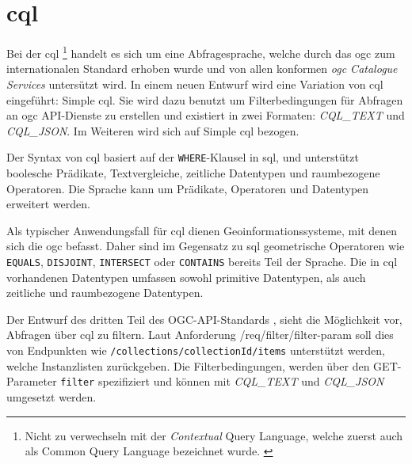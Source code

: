 \section{\acl{cql}}


Bei der \acf{cql} \footnote{Nicht zu verwechseln mit der \textit{Contextual} Query Language, welche
zuerst auch als Common Query Language bezeichnet wurde.
\parencite{thelibraryofcongressCQLContextual2023, ZINGGentle2003}} handelt es sich um eine
Abfragesprache, welche durch das \ac{ogc} zum internationalen Standard erhoben wurde und von allen
konformen \textit{\ac{ogc} Catalogue Services} untersützt wird.  In
einem neuen Entwurf  wird eine Variation von \ac{cql} eingeführt: Simple
\ac{cql}. Sie wird dazu benutzt um Filterbedingungen für Abfragen an \ac{ogc} API-Dienste zu
erstellen und existiert in zwei Formaten: \textit{CQL\_TEXT} und \textit{CQL\_JSON}.  Im
Weiteren wird sich auf Simple \ac{cql} bezogen.

Der Syntax von \ac{cql} basiert auf der \texttt{WHERE}-Klausel in \acs{sql}, und unterstützt
boolesche Prädikate, Textvergleiche, zeitliche Datentypen und raumbezogene Operatoren. Die Sprache
kann um Prädikate, Operatoren und Datentypen erweitert werden.

Als typischer Anwendungsfall für \ac{cql} dienen Geoinformationssysteme, mit denen sich die \ac{ogc}
befasst. Daher sind im Gegensatz zu \ac{sql} geometrische Operatoren wie \texttt{EQUALS},
\texttt{DISJOINT}, \texttt{INTERSECT} oder \texttt{CONTAINS} bereits Teil der Sprache. Die in
\ac{cql} vorhandenen Datentypen umfassen sowohl primitive Datentypen, als auch zeitliche und
raumbezogene Datentypen.

Der Entwurf des dritten Teil des OGC-API-Standards , sieht die
Möglichkeit vor, Abfragen über \ac{cql} zu filtern. Laut Anforderung /req/filter/filter-param soll
dies von Endpunkten wie \texttt{/collections/{collectionId}/items} unterstützt werden, welche
Instanzlisten zurückgeben. Die Filterbedingungen, werden über den GET-Parameter \texttt{filter}
spezifiziert und können mit \textit{CQL\_TEXT} und \textit{CQL\_JSON} umgesetzt werden.

